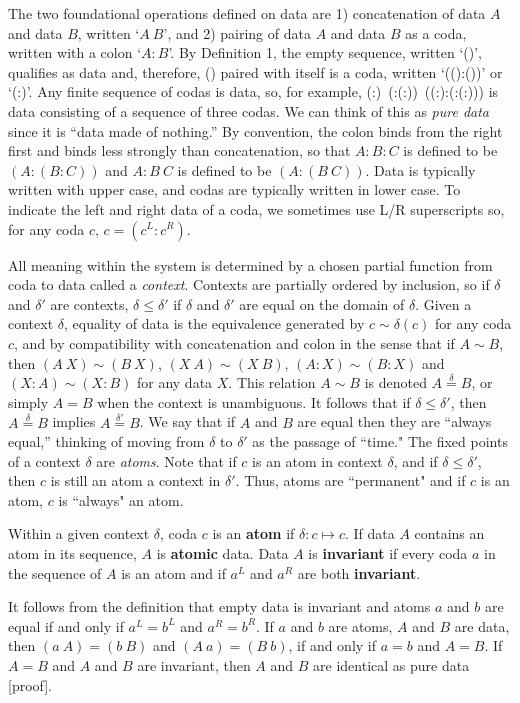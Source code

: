\documentclass[11pt]{article}
\begin{document}
\noindent The two foundational operations defined on data are 1) concatenation of data $A$ and data $B$, written `$A\ B$', and 2) pairing of data $A$ and data $B$ as a coda, written with a colon `$A:B$'.   
By Definition 1, the empty sequence, written `()', qualifies as data and, therefore, () paired with itself is a coda, written `(():())' or `(:)'.  
Any finite sequence of codas is data, so, for example, (:)\ (:(:))\ ((:):(:(:))) is  
data consisting of a sequence of three codas.  We can think of this as {\it pure data} since it is ``data made of nothing.''  
By convention, the colon binds from the right first and binds less strongly than concatenation, so that $A:B:C$ is defined to be $(A:(B:C))$ and $A:B\ C$ is defined to be $(A:(B\ C))$.  
Data is typically written with upper case, and codas are typically written in lower case.  
To indicate the left and right data of a coda, we sometimes use L/R superscripts so, for any coda $c$, $c=(c^L:c^R)$. 

     All meaning within the system is determined by a chosen partial function from coda to data called a {\it context}. 
Contexts are partially ordered by inclusion, so if $\delta$ and $\delta'$ are contexts, $\delta\le\delta'$ if $\delta$ and $\delta'$ are equal on the domain of $\delta$.  
Given a context $\delta$, equality of data is the equivalence generated by $c\sim \delta(c)$ for any coda $c$, and by compatibility with concatenation and colon in the sense that 
if $A\sim B$, then $(A\ X)\sim (B\ X)$, $(X\ A)\sim (X\ B)$, $(A:X)\sim (B:X)$ and $(X:A)\sim(X:B)$ for any data $X$.  This relation $A\sim B$ is denoted $A{\overset\delta =}B$, 
or simply $A=B$ when the context is unambiguous.   
It follows that if $\delta\leq\delta'$, then $A{\overset\delta =}B$ implies $A{\overset{\delta'} =}B$.  We say that if $A$ and $B$ are equal then they are ``always equal,'' thinking 
of moving from $\delta$ to $\delta'$ as the passage of ``time."  The fixed points of a context $\delta$ are {\it atoms}.  Note that if $c$ is an atom in context $\delta$, 
and if $\delta\leq\delta'$, then $c$ is still an atom a context in $\delta'$.  Thus, atoms are ``permanent" and if $c$ is an atom, $c$ is ``always" an atom.  

\begin{definition}
{Within a given context $\delta$, coda $c$ is an {\bf atom} if $\delta:c\mapsto c$.  If data $A$ contains an atom in its sequence, $A$ is {\bf atomic} data. 
Data $A$ is {\bf invariant} if every coda $a$ in the sequence of $A$ is an atom and if $a^L$ and $a^R$ are both {\bf invariant}. }
\end{definition}
\noindent It follows from the definition that empty data is invariant and atoms $a$ and $b$ are equal if and only if $a^L=b^L$ and $a^R=b^R$.  If $a$ and $b$ are atoms, 
$A$ and $B$ are data, then $(a\ A)=(b\ B)$ and $(A\ a)=(B\ b)$, if and only if $a=b$ and $A=B$.  If $A=B$ and $A$ and $B$ are invariant, then $A$ and 
$B$ are identical as pure data [proof].
\end{document}
